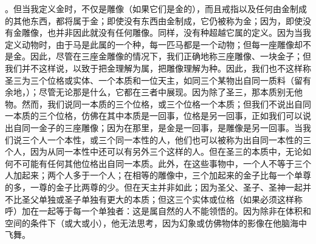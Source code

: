 。但当我定义金时，不仅是雕像（如果它们是金的），而且戒指以及任何由金制成的其他东西，都将属于金；即使没有东西由金制成，它仍被称为金；因为，即使没有金雕像，也并非因此就没有任何雕像。同样，没有种超越它属的定义。因为当我定义动物时，由于马是此属的一个种，每一匹马都是一个动物；但每一座雕像却不是金。因此，尽管在三座金雕像的情况下，我们正确地称三座雕像、一块金子；但我们并不这样说，以致于把金理解为属，把雕像理解为种。因此，我们也不这样称圣三为三个位格或实体、一个本质和一位天主，如同三个某物出自同一质料（留有余地，）；尽管无论那是什么，它都在三者中展现。因为除了圣三，那本质别无他物。然而，我们说同一本质的三个位格，或三个位格一个本质；但我们不说出自同一本质的三个位格，仿佛在其中本质是一回事，位格是另一回事，正如我们可以说出自同一金子的三座雕像；因为在那里，是金是一回事，是雕像是另一回事。当我们说三个人一个本性，或三个同一本性的人，他们也可以被称为出自同一本性的三个人，因为从同一本性中还可以有另外三个这样的人。但在圣三的本质中，无论如何不可能有任何其他位格出自同一本质。此外，在这些事物中，一个人不等于三个人加起来；两个人多于一个人；在相等的雕像中，三个加起来的金子比每一个单尊的多，一尊的金子比两尊的少。但在天主并非如此；因为圣父、圣子、圣神一起并不比圣父单独或圣子单独有更大的本质；但这三个实体或位格（如果必须这样称呼）加在一起等于每一个单独者：这是属自然的人不能领悟的。因为除非在体积和空间的条件下（或大或小），他无法思考，因为幻象或仿佛物体的影像在他脑海中飞舞。\par

